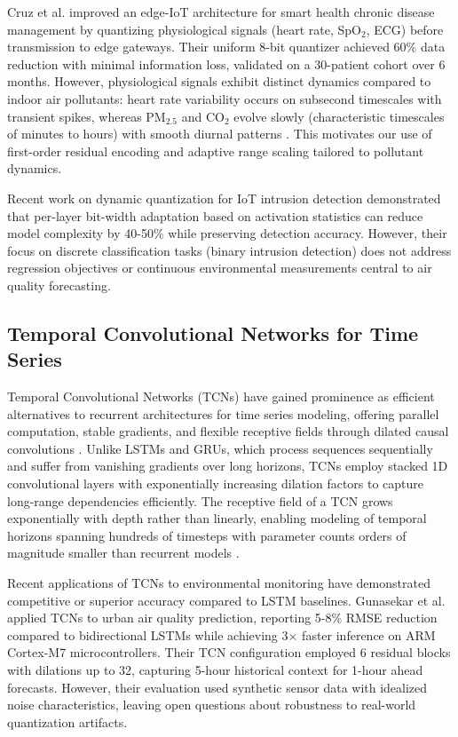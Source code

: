 Cruz et al. \cite{cruz2024improvement} improved an edge-IoT architecture for smart health chronic disease management by quantizing physiological signals (heart rate, SpO$_2$, ECG) before transmission to edge gateways. Their uniform 8-bit quantizer achieved 60\% data reduction with minimal information loss, validated on a 30-patient cohort over 6 months. However, physiological signals exhibit distinct dynamics compared to indoor air pollutants: heart rate variability occurs on subsecond timescales with transient spikes, whereas PM$_{2.5}$ and CO$_2$ evolve slowly (characteristic timescales of minutes to hours) with smooth diurnal patterns \cite{karmakar2024exploring}. This motivates our use of first-order residual encoding and adaptive range scaling tailored to pollutant dynamics.

Recent work on dynamic quantization for IoT intrusion detection \cite{guo2023dynamic} demonstrated that per-layer bit-width adaptation based on activation statistics can reduce model complexity by 40-50\% while preserving detection accuracy. However, their focus on discrete classification tasks (binary intrusion detection) does not address regression objectives or continuous environmental measurements central to air quality forecasting.

\subsection{Temporal Convolutional Networks for Time Series}

Temporal Convolutional Networks (TCNs) have gained prominence as efficient alternatives to recurrent architectures for time series modeling, offering parallel computation, stable gradients, and flexible receptive fields through dilated causal convolutions \cite{bai2018tcn}. Unlike LSTMs and GRUs, which process sequences sequentially and suffer from vanishing gradients over long horizons, TCNs employ stacked 1D convolutional layers with exponentially increasing dilation factors to capture long-range dependencies efficiently. The receptive field of a TCN grows exponentially with depth rather than linearly, enabling modeling of temporal horizons spanning hundreds of timesteps with parameter counts orders of magnitude smaller than recurrent models \cite{lea2017tcn}.

Recent applications of TCNs to environmental monitoring have demonstrated competitive or superior accuracy compared to LSTM baselines. Gunasekar et al. \cite{gunasekar2025power} applied TCNs to urban air quality prediction, reporting 5-8\% RMSE reduction compared to bidirectional LSTMs while achieving 3$\times$ faster inference on ARM Cortex-M7 microcontrollers. Their TCN configuration employed 6 residual blocks with dilations up to 32, capturing 5-hour historical context for 1-hour ahead forecasts. However, their evaluation used synthetic sensor data with idealized noise characteristics, leaving open questions about robustness to real-world quantization artifacts.

